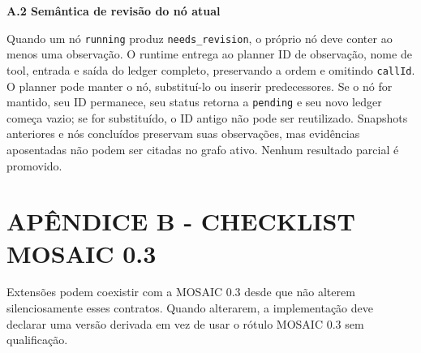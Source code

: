 \documentclass[12pt,a4paper]{article}
\begin{document}
\textbf{A.2 Semântica de revisão do nó atual}


Quando um nó \texttt{running} produz \texttt{needs\_revision}, o próprio nó deve conter ao menos uma observação. O runtime entrega ao planner ID de observação, nome de tool, entrada e saída do ledger completo, preservando a ordem e omitindo \texttt{callId}. O planner pode manter o nó, substituí-lo ou inserir predecessores. Se o nó for mantido, seu ID permanece, seu status retorna a \texttt{pending} e seu novo ledger começa vazio; se for substituído, o ID antigo não pode ser reutilizado. Snapshots anteriores e nós concluídos preservam suas observações, mas evidências aposentadas não podem ser citadas no grafo ativo. Nenhum resultado parcial é promovido.



\section*{APÊNDICE B - CHECKLIST MOSAIC 0.3}



Extensões podem coexistir com a MOSAIC 0.3 desde que não alterem silenciosamente esses contratos. Quando alterarem, a implementação deve declarar uma versão derivada em vez de usar o rótulo MOSAIC 0.3 sem qualificação.
\end{document}
